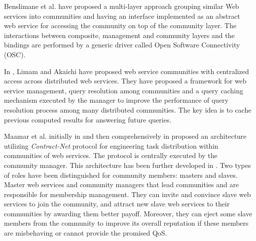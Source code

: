 Benslimane et al. \cite{Liris-2770} have proposed a multi-layer
approach grouping similar Web services into communities and having
an interface implemented as an abstract web service for accessing
the community on top of the community layer. The interactions
between composite, management and community layers and the
bindings are performed by a generic driver called Open Software
Connectivity (OSC).

In \cite{managing-hela-jalel}, Limam and Akaichi have proposed web
service communities with centralized access across distributed web
services. They have proposed a framework for web service
management, query resolution among communities and a query caching
mechanism executed by the manager to improve the performance of
query resolution process among many distributed communities. The
key idea is to cache previous computed results for answering
future queries.


Maamar et al. initially in \cite{conf/webist/MaamarLBTS07} and
then comprehensively in \cite{DBLP:journals/ijebr/MaamarSTBB09}
proposed an architecture utilizing \emph{Contract-Net} protocol
for engineering task distribution within communities of web
services. The protocol is centrally executed by the community
manager. This architecture has been further developed in
\cite{CSTintercommunity, conf/IEEEscc/BenharrefSBB11,
conf/IEEEscc/KhosravifarBMMT10, conf/aina/LimTM11}. Two types of
roles have been distinguished for community members: masters and
slaves. Master web services and community managers that lead
communities and are responsible for membership management. They
can invite and convince slave web services to join the community,
and attract new slave web services to their communities by
awarding them better payoff. Moreover, they can eject some slave
members from the community to improve its overall reputation if
these members are misbehaving or cannot provide the promised QoS.

